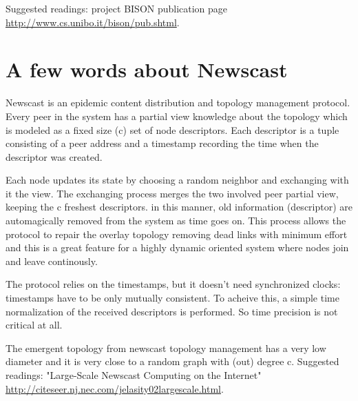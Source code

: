 \documentclass[a4paper,11pt]{article}
\begin{document}
Suggested readings: project BISON publication page \url{http://www.cs.unibo.it/bison/pub.shtml}.


\section{\label{sec:Appendix-B-newscast}A few words about Newscast}

Newscast is an epidemic content distribution and topology management
protocol. Every peer in the system has a partial view knowledge about
the topology which is modeled as a fixed size (c) set of node descriptors.
Each descriptor is a tuple consisting of a peer address and a timestamp
recording the time when the descriptor was created.

Each node updates its state by choosing a random neighbor and exchanging
with it the view. The exchanging process merges the two involved peer
partial view, keeping the c freshest descriptors. in this manner,
old information (descriptor) are automagically removed from the system
as time goes on. This process allows the protocol to repair the overlay
topology removing dead links with minimum effort and this is a great
feature for a highly dynamic oriented system where nodes join and
leave continously. 

The protocol relies on the timestamps, but it doesn't need synchronized
clocks: timestamps have to be only mutually consistent. To acheive
this, a simple time normalization of the received descriptors is performed.
So time precision is not critical at all. 

The emergent topology from newscast topology management has a very
low diameter and it is very close to a random graph with (out) degree
c. Suggested readings: "Large-Scale Newscast Computing on the Internet" \url{http://citeseer.nj.nec.com/jelasity02largescale.html}.
\end{document}
